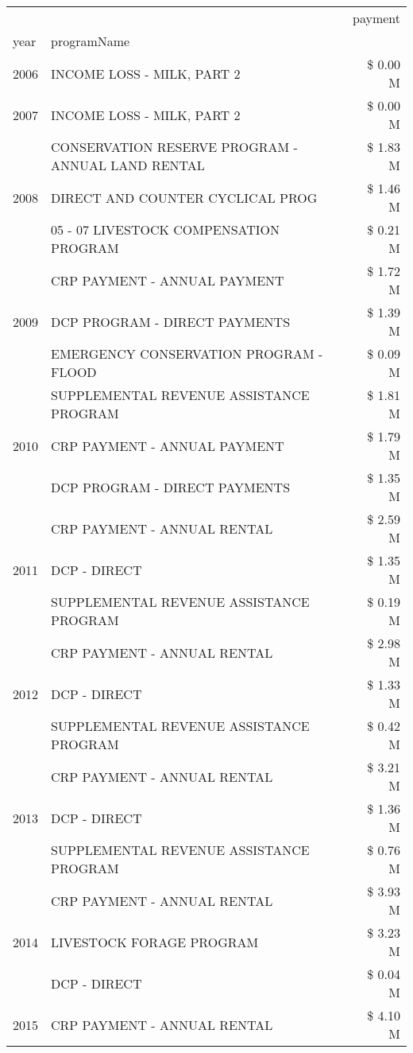 \begin{tabular}{llr}
\toprule
 &  & payment \\
year & programName &  \\
\midrule
2006 & INCOME LOSS - MILK, PART 2 & \$ 0.00 M \\
\cline{1-3}
2007 & INCOME LOSS - MILK, PART 2 & \$ 0.00 M \\
\cline{1-3}
\multirow[t]{3}{*}{2008} & CONSERVATION RESERVE PROGRAM - ANNUAL LAND RENTAL & \$ 1.83 M \\
 & DIRECT AND COUNTER CYCLICAL PROG & \$ 1.46 M \\
 & 05 - 07 LIVESTOCK COMPENSATION PROGRAM & \$ 0.21 M \\
\cline{1-3}
\multirow[t]{3}{*}{2009} & CRP PAYMENT - ANNUAL PAYMENT & \$ 1.72 M \\
 & DCP PROGRAM - DIRECT PAYMENTS & \$ 1.39 M \\
 & EMERGENCY CONSERVATION PROGRAM - FLOOD & \$ 0.09 M \\
\cline{1-3}
\multirow[t]{3}{*}{2010} & SUPPLEMENTAL REVENUE ASSISTANCE PROGRAM & \$ 1.81 M \\
 & CRP PAYMENT - ANNUAL PAYMENT & \$ 1.79 M \\
 & DCP PROGRAM - DIRECT PAYMENTS & \$ 1.35 M \\
\cline{1-3}
\multirow[t]{3}{*}{2011} & CRP PAYMENT - ANNUAL RENTAL & \$ 2.59 M \\
 & DCP - DIRECT & \$ 1.35 M \\
 & SUPPLEMENTAL REVENUE ASSISTANCE PROGRAM & \$ 0.19 M \\
\cline{1-3}
\multirow[t]{3}{*}{2012} & CRP PAYMENT - ANNUAL RENTAL & \$ 2.98 M \\
 & DCP - DIRECT & \$ 1.33 M \\
 & SUPPLEMENTAL REVENUE ASSISTANCE PROGRAM & \$ 0.42 M \\
\cline{1-3}
\multirow[t]{3}{*}{2013} & CRP PAYMENT - ANNUAL RENTAL & \$ 3.21 M \\
 & DCP - DIRECT & \$ 1.36 M \\
 & SUPPLEMENTAL REVENUE ASSISTANCE PROGRAM & \$ 0.76 M \\
\cline{1-3}
\multirow[t]{3}{*}{2014} & CRP PAYMENT - ANNUAL RENTAL & \$ 3.93 M \\
 & LIVESTOCK FORAGE PROGRAM & \$ 3.23 M \\
 & DCP - DIRECT & \$ 0.04 M \\
\cline{1-3}
\multirow[t]{3}{*}{2015} & CRP PAYMENT - ANNUAL RENTAL & \$ 4.10 M \\

\end{tabular}
